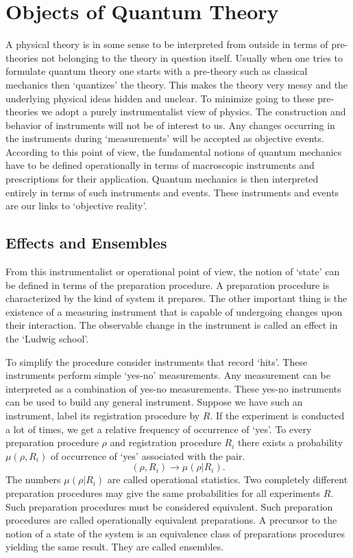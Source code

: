 \documentclass[11pt]{report}
\begin{document}
	\chapter{Objects of Quantum Theory}
	A physical theory is in some sense to be interpreted from outside in terms of pre-theories not belonging to the theory in question itself. Usually when one tries to formulate quantum theory one starts with a pre-theory such as classical mechanics then `quantizes' the theory. This makes the theory very messy and the underlying physical ideas hidden and unclear. To minimize going to these pre-theories we adopt a purely instrumentalist view of physics. The construction and behavior of instruments will not be of interest to us. Any changes occurring in the instruments during `measurements' will be accepted as objective events. According to this point of view, the fundamental notions of quantum mechanics have to be defined operationally in terms of macroscopic instruments and prescriptions for their application. Quantum mechanics is then interpreted entirely in terms of such instruments and events. These instruments and events are our links to `objective reality'.
	
	\section{Effects and Ensembles}\label{section:Semantics1}
	From this instrumentalist or operational point of view, the notion of `state' can be defined in terms of the preparation procedure. A preparation procedure is characterized by the kind of system it prepares. The other important thing is the existence of a measuring instrument that is capable of undergoing changes upon their interaction. The observable change in the instrument is called an effect in the `Ludwig school'.
	
	To simplify the procedure consider instruments that record `hits'. These instruments perform simple `yes-no' measurements. Any measurement can be interpreted as a combination of yes-no measurements. These yes-no instruments can be used to build any general instrument. Suppose we have such an instrument, label its registration procedure by $R$. If the experiment is conducted a lot of times, we get a relative frequency of occurrence of `yes'. To every preparation procedure $\rho$ and registration procedure $R_i$ there exists a probability $\mu(\rho, R_i)$ of occurrence of `yes' associated with the pair.
	$$(\rho,R_i)\longrightarrow \mu(\rho|R_i).$$
	The numbers $\mu(\rho|R_i)$ are called operational statistics. Two completely different preparation procedures may give the same probabilities for all experiments $R$. Such preparation procedures must be considered equivalent. Such preparation procedures are called operationally equivalent preparations. A precursor to the notion of a state of the system is an equivalence class of preparations procedures yielding the same result. They are called ensembles. 
	
\end{document}
